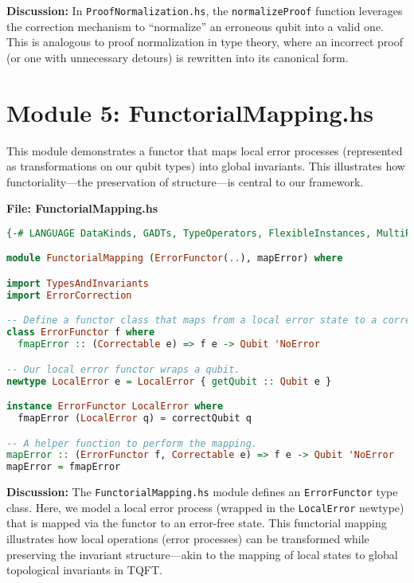 \documentclass[12pt]{article}
\begin{document}
\bigskip

\noindent\textbf{Discussion:}  
In \texttt{ProofNormalization.hs}, the \texttt{normalizeProof} function leverages the correction mechanism to “normalize” an erroneous qubit into a valid one. This is analogous to proof normalization in type theory, where an incorrect proof (or one with unnecessary detours) is rewritten into its canonical form.

\newpage

\section{Module 5: FunctorialMapping.hs}

This module demonstrates a functor that maps local error processes (represented as transformations on our qubit types) into global invariants. This illustrates how functoriality—the preservation of structure—is central to our framework.

\bigskip

\noindent\textbf{File: FunctorialMapping.hs}
\begin{lstlisting}[language=Haskell, caption={FunctorialMapping.hs}]
{-# LANGUAGE DataKinds, GADTs, TypeOperators, FlexibleInstances, MultiParamTypeClasses #-}

module FunctorialMapping (ErrorFunctor(..), mapError) where

import TypesAndInvariants
import ErrorCorrection

-- Define a functor class that maps from a local error state to a corrected invariant.
class ErrorFunctor f where
  fmapError :: (Correctable e) => f e -> Qubit 'NoError

-- Our local error functor wraps a qubit.
newtype LocalError e = LocalError { getQubit :: Qubit e }

instance ErrorFunctor LocalError where
  fmapError (LocalError q) = correctQubit q

-- A helper function to perform the mapping.
mapError :: (ErrorFunctor f, Correctable e) => f e -> Qubit 'NoError
mapError = fmapError
\end{lstlisting}

\bigskip

\noindent\textbf{Discussion:}  
The \texttt{FunctorialMapping.hs} module defines an \texttt{ErrorFunctor} type class. Here, we model a local error process (wrapped in the \texttt{LocalError} newtype) that is mapped via the functor to an error-free state. This functorial mapping illustrates how local operations (error processes) can be transformed while preserving the invariant structure—akin to the mapping of local states to global topological invariants in TQFT.
\end{document}
